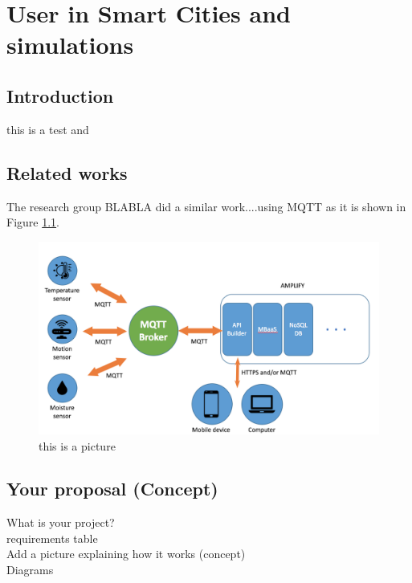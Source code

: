 \chapter{User in Smart Cities and simulations}
\label{intro} 



\section{Introduction}
\label{sec:1}

this is a test \cite{test} and \cite{test2}

\section{Related works}
\label{sec:2}

The research group BLABLA \cite{cheng2015building} did a similar work....using MQTT as it is shown in Figure \ref{fig:1}.
\begin{figure}
\sidecaption
\includegraphics[scale=.09]{images/figure.png}
\caption{this is a picture}
\label{fig:1}
\end{figure}


\section{Your proposal (Concept)}
\label{sec:3}
   What is your project?
\\ requirements table
\\ Add a picture explaining how it works (concept)
\\ Diagrams
\\

